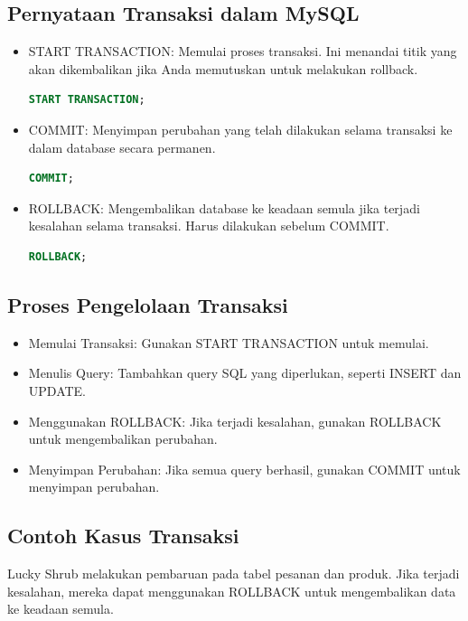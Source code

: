 \documentclass{article}
\begin{document}
\subsection{Pernyataan Transaksi dalam MySQL}
\begin{itemize}
    \item  START TRANSACTION: Memulai proses transaksi. Ini menandai titik yang akan dikembalikan jika Anda memutuskan untuk melakukan rollback.
          \begin{lstlisting}[language=SQL, caption={}, captionpos=b]
START TRANSACTION;
\end{lstlisting}
    \item COMMIT: Menyimpan perubahan yang telah dilakukan selama transaksi ke dalam database secara permanen.
          \begin{lstlisting}[language=SQL, caption={}, captionpos=b]
COMMIT;
\end{lstlisting}
    \item ROLLBACK: Mengembalikan database ke keadaan semula jika terjadi kesalahan selama transaksi. Harus dilakukan sebelum COMMIT.
          \begin{lstlisting}[language=SQL, caption={}, captionpos=b]
ROLLBACK;
\end{lstlisting}
\end{itemize}

\subsection{Proses Pengelolaan Transaksi}
\begin{itemize}
    \item Memulai Transaksi: Gunakan START TRANSACTION untuk memulai.
    \item Menulis Query: Tambahkan query SQL yang diperlukan, seperti INSERT dan UPDATE.
    \item Menggunakan ROLLBACK: Jika terjadi kesalahan, gunakan ROLLBACK untuk mengembalikan perubahan.
    \item Menyimpan Perubahan: Jika semua query berhasil, gunakan COMMIT untuk menyimpan perubahan.
\end{itemize}

\subsection{Contoh Kasus Transaksi}
Lucky Shrub melakukan pembaruan pada tabel pesanan dan produk. Jika terjadi kesalahan, mereka dapat menggunakan ROLLBACK untuk mengembalikan data ke keadaan semula.
\end{document}
